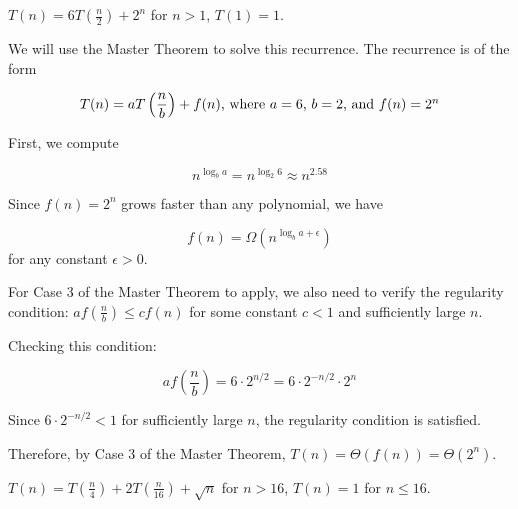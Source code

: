 \documentclass[11pt,fleqn]{exam}
\newenvironment{soln}{\color{solnblue}}{}
\newif\ifsolutions\solutionsfalse
\begin{document}
\begin{questions}

    \question[3] $T(n) = 6T\left( \frac{n}{2} \right) + 2^n$ for $n > 1$, $T(1) = 1$.

    \begin{soln}
        We will use the Master Theorem to solve this recurrence. 
        The recurrence is of the form 
        
        \[T(n) = aT\left( \frac{n}{b} \right) + f(n)$, where $a = 6$, $b = 2$, and $f(n) = 2^n\]

        First, we compute 
        
        \[n^{\log_b a} = n^{\log_2 6} \approx n^{2.58}\]

        Since $f(n) = 2^n$ grows faster than any polynomial, we have 

        \[f(n) = \Omega(n^{\log_b a + \epsilon})\] for any constant $\epsilon > 0$.

        For Case 3 of the Master Theorem to apply, we also need to verify the regularity condition:
        $af\left(\frac{n}{b}\right) \leq cf(n)$ for some constant $c < 1$ and sufficiently large $n$.

        Checking this condition:
        
        \[af\left(\frac{n}{b}\right) = 6 \cdot 2^{n/2} = 6 \cdot 2^{-n/2} \cdot 2^n\]

        Since $6 \cdot 2^{-n/2} < 1$ for sufficiently large $n$, the regularity condition is satisfied.

        Therefore, by Case 3 of the Master Theorem, $T(n) = \Theta(f(n)) = \Theta(2^n)$.
    \end{soln}

    \ifsolutions\fi 

    \question[3] $T(n) = T\left( \frac{n}{4} \right) + 2T\left( \frac{n}{16} \right) + \sqrt{n}$ for $n > 16$, $T(n) = 1$ for $n \le 16$.


\end{questions}
\end{document}
